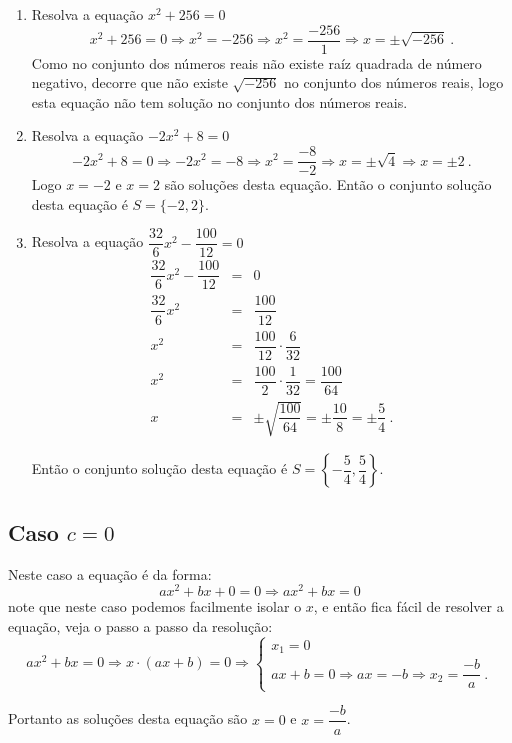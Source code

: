 \begin{exem}
\begin{enumerate}[1)]
  \item Resolva a equação $x^2 + 256=0$
 \[x^2 +256=0 \Rightarrow x^2= -256 \Rightarrow x^2= \frac{-256}{1} \Rightarrow x= \pm \sqrt{-256} \ .\]
 Como no conjunto dos números reais não existe raíz quadrada de número negativo, decorre que não existe $\sqrt{-256}$ no conjunto dos números reais, logo esta equação não tem solução no conjunto dos números reais.

   \item Resolva a equação $-2x^2 + 8=0$
 \[-2x^2 + 8=0 \Rightarrow -2x^2= -8 \Rightarrow x^2= \frac{-8}{-2} \Rightarrow x= \pm \sqrt{4} \Rightarrow x= \pm 2 \ .\]
 Logo $x= -2$ e $x= 2$ são soluções desta equação. Então o conjunto solução desta equação é $S= \{-2, 2\}$.

   \item Resolva a equação $\dfrac{32}{6}x^2 - \dfrac{100}{12}=0$
   \begin{eqnarray*}
   \dfrac{32}{6}x^2 - \dfrac{100}{12} &=& 0 \\
   \dfrac{32}{6}x^2 &=& \dfrac{100}{12} \\
   x^2 &=& \dfrac{100}{12} \cdot \dfrac{6}{32} \\
   x^2 &=& \dfrac{100}{2} \cdot \dfrac{1}{32} = \dfrac{100}{64} \\
   x &=& \pm \sqrt{\dfrac{100}{64}} = \pm \dfrac{10}{8} = \pm \dfrac{5}{4} \ .
   \end{eqnarray*}


 Então o conjunto solução desta equação é $S= \left\{-\dfrac{5}{4}, \dfrac{5}{4} \right\}$.
 \end{enumerate}
 \end{exem}

 \subsection{Caso \texorpdfstring{$c=0$}{c=0}}

 Neste caso a equação é da forma:
 \[ax^2 + bx + 0= 0 \Rightarrow ax^2 + bx= 0\]
 note que neste caso podemos facilmente isolar o $x$, e então fica fácil de resolver a equação, veja o passo a passo da resolução:
 \[ax^2 + bx= 0 \Rightarrow x \cdot (ax + b)= 0 \Rightarrow
 \begin{cases}
 x_1= 0 \\
 ax+b=0 \Rightarrow ax= -b \Rightarrow x_2= \dfrac{-b}{a} \ .
 \end{cases}
  \]

 Portanto as soluções desta equação são $x= 0$ e $x= \dfrac{-b}{a}$.


